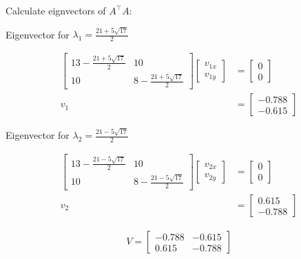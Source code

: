 \documentclass[11pt,letterpaper]{article}
\begin{document}
\begin{enumerate}
Calculate eignvectors of \( A^\top A \):

Eigenvector for \( \lambda_1 = \frac{21+5\sqrt{17}}{2} \)

\begin{align*}
    \begin{bmatrix}
        13-\frac{21+5\sqrt{17}}{2} & 10 \\
        10 & 8-\frac{21+5\sqrt{17}}{2}
    \end{bmatrix}
    \begin{bmatrix}
        v_{1x} \\ v_{1y}
    \end{bmatrix}
    &= \begin{bmatrix}
        0 \\ 0
    \end{bmatrix} \\
    v_1
    &= \begin{bmatrix}
        -0.788 \\ -0.615
    \end{bmatrix}
\end{align*}

Eigenvector for \( \lambda_2 = \frac{21-5\sqrt{17}}{2} \)

\begin{align*}
    \begin{bmatrix}
        13-\frac{21-5\sqrt{17}}{2} & 10 \\
        10 & 8-\frac{21-5\sqrt{17}}{2}
    \end{bmatrix}
    \begin{bmatrix}
        v_{2x} \\ v_{2y}
    \end{bmatrix}
    &= \begin{bmatrix}
        0 \\ 0
    \end{bmatrix} \\
    v_2
    &= \begin{bmatrix}
        0.615 \\ -0.788
    \end{bmatrix}
\end{align*}

\begin{align*}
V = {\begin{bmatrix}
        -0.788 & -0.615 \\
        0.615 & -0.788
    \end{bmatrix}}
\end{align*}


\end{enumerate}
\end{document}
